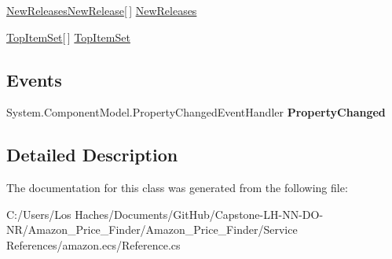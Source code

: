 \begin{DoxyCompactItemize}
\begin{DoxyCompactList}\small\item\em \end{DoxyCompactList}\item 
\hypertarget{class_amazon___price___finder_1_1amazon_1_1ecs_1_1_browse_node_abcbefa18f216666048220a0f44cf66b0}{\hyperlink{class_amazon___price___finder_1_1amazon_1_1ecs_1_1_new_releases_new_release}{New\-Releases\-New\-Release}\mbox{[}$\,$\mbox{]} \hyperlink{class_amazon___price___finder_1_1amazon_1_1ecs_1_1_browse_node_abcbefa18f216666048220a0f44cf66b0}{New\-Releases}}\label{class_amazon___price___finder_1_1amazon_1_1ecs_1_1_browse_node_abcbefa18f216666048220a0f44cf66b0}

\begin{DoxyCompactList}\small\item\em \end{DoxyCompactList}\item 
\hypertarget{class_amazon___price___finder_1_1amazon_1_1ecs_1_1_browse_node_acbc867f2573c125cb2c86eea5561c685}{\hyperlink{class_amazon___price___finder_1_1amazon_1_1ecs_1_1_top_item_set}{Top\-Item\-Set}\mbox{[}$\,$\mbox{]} \hyperlink{class_amazon___price___finder_1_1amazon_1_1ecs_1_1_browse_node_acbc867f2573c125cb2c86eea5561c685}{Top\-Item\-Set}}\label{class_amazon___price___finder_1_1amazon_1_1ecs_1_1_browse_node_acbc867f2573c125cb2c86eea5561c685}

\begin{DoxyCompactList}\small\item\em \end{DoxyCompactList}\end{DoxyCompactItemize}
\subsection*{Events}
\begin{DoxyCompactItemize}
\item 
\hypertarget{class_amazon___price___finder_1_1amazon_1_1ecs_1_1_browse_node_a640b14ad60a6fae611ff66f6770127b1}{System.\-Component\-Model.\-Property\-Changed\-Event\-Handler {\bfseries Property\-Changed}}\label{class_amazon___price___finder_1_1amazon_1_1ecs_1_1_browse_node_a640b14ad60a6fae611ff66f6770127b1}

\end{DoxyCompactItemize}


\subsection{Detailed Description}


The documentation for this class was generated from the following file\-:\begin{DoxyCompactItemize}
\item 
C\-:/\-Users/\-Los Haches/\-Documents/\-Git\-Hub/\-Capstone-\/\-L\-H-\/\-N\-N-\/\-D\-O-\/\-N\-R/\-Amazon\-\_\-\-Price\-\_\-\-Finder/\-Amazon\-\_\-\-Price\-\_\-\-Finder/\-Service References/amazon.\-ecs/Reference.\-cs\end{DoxyCompactItemize}
